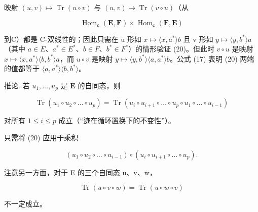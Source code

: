映射 \((u, v) \mapsto \operatorname{Tr}(u \circ v)\) 与 \((u, v) \mapsto \operatorname{Tr}(v \circ u)\)（从

\[
\operatorname{Hom} _ {\mathbf {c}} (\mathbf {E}, \mathbf {F}) \times \operatorname{Hom} _ {\mathbf {c}} (\mathbf {F}, \mathbf {E})
\]

到C）都是 C-双线性的；因此只需在 u 形如 \(x \mapsto \langle x, a^{*} \rangle b\) 且 v 形如 \(y \mapsto \langle y, b^{*} \rangle a\)（其中 \(a \in E\)、\(a^{*} \in E^{*}\)、\(b \in F\)、\(b^{*} \in F^{*}\)）的情形验证 (20)。但此时 \(v \circ u\) 是映射 \(x \mapsto \langle x, a^{*} \rangle \langle b, b^{*} \rangle a\)，而 \(u \circ v\) 是映射 \(y \mapsto \langle y, b^{*} \rangle \langle a, a^{*} \rangle b\)。公式 (17) 表明 (20) 两端的值都等于 \(\langle a, a^{*} \rangle \langle b, b^{*} \rangle\)。

推论. 若 \(u_1, \ldots, u_p\) 是 \(\mathbf{E}\) 的自同态，则

\[
\operatorname{Tr} \left(u _ {1} \circ u _ {2} \circ \dots \circ u _ {p}\right) = \operatorname{Tr} \left(u _ {i} \circ u _ {i + 1} \circ \dots \circ u _ {p} \circ u _ {1} \circ \dots \circ u _ {i - 1}\right)
\]

对所有 \(1 \leqslant i \leqslant p\) 成立（“迹在循环置换下的不变性”）。

只需将 (20) 应用于乘积

\[
\left(u _ {1} \circ u _ {2} \circ \dots \circ u _ {i - 1}\right) \circ \left(u _ {i} \circ u _ {i + 1} \circ \dots \circ u _ {p}\right).
\]

注意另一方面，对于 E 的三个自同态 u、v、w，

\[
\operatorname{Tr} (u \circ v \circ w) = \operatorname{Tr} (u \circ w \circ v)
\]

不一定成立。

